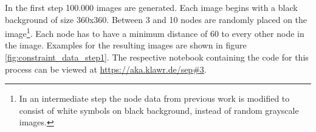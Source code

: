In the first step 100.000 images are generated.
Each image begins with a black background of size 360x360.
Between 3 and 10 nodes are randomly placed on the image\footnote{In an intermediate step the node data from previous work is modified to consist of white symbols on black background, instead of random grayscale images.}.
Each node has to have a minimum distance of 60 to every other node in the image.
Examples for the resulting images are shown in figure \ref{fig:constraint_data_step1}.
The respective notebook containing the code for this process can be viewed at \url{https://aka.klawr.de/sep\#3}.

\begin{figure}
    \centering
    \label{fig:constraint_data_step1}
    \begin{subfigure}[b]{0.19\textwidth}
    \end{subfigure}
    \begin{subfigure}[b]{0.19\textwidth}

\end{subfigure}
\end{figure}
